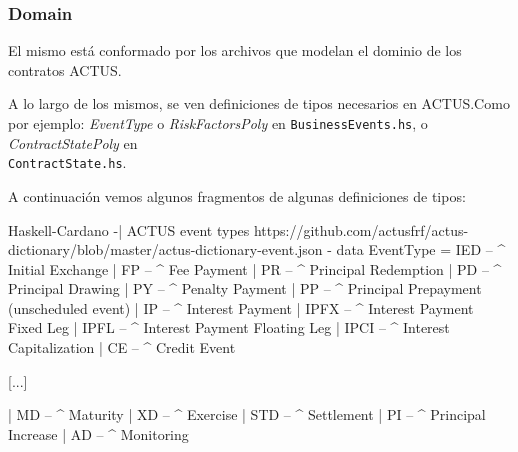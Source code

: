 \documentclass[12pt]{book}
\begin{document}
\subsubsection{Domain}

El mismo está conformado por los archivos que modelan el dominio de los contratos ACTUS.\@


A lo largo de los mismos, se ven definiciones de tipos necesarios en ACTUS.\@ Como por ejemplo: \textit{EventType} o \textit{RiskFactorsPoly} en \texttt{BusinessEvents.hs}, o \textit{ContractStatePoly} en\\ \texttt{ContractState.hs}.

A continuación vemos algunos fragmentos de algunas definiciones de tipos:

\begin{code}[title=Algunos tipos de eventos.]{Haskell-Cardano}
{-| ACTUS event types
    https://github.com/actusfrf/actus-dictionary/blob/master/actus-dictionary-event.json
-}
data EventType =
      IED  -- ^ Initial Exchange
    | FP   -- ^ Fee Payment
    | PR   -- ^ Principal Redemption
    | PD   -- ^ Principal Drawing
    | PY   -- ^ Penalty Payment
    | PP   -- ^ Principal Prepayment (unscheduled event)
    | IP   -- ^ Interest Payment
    | IPFX -- ^ Interest Payment Fixed Leg
    | IPFL -- ^ Interest Payment Floating Leg
    | IPCI -- ^ Interest Capitalization
    | CE   -- ^ Credit Event

    [...]

    | MD   -- ^ Maturity
    | XD   -- ^ Exercise
    | STD  -- ^ Settlement
    | PI   -- ^ Principal Increase
    | AD   -- ^ Monitoring
\end{code}
\end{document}
